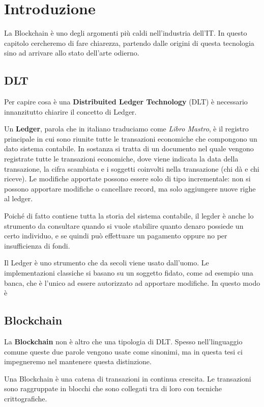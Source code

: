 \chapter{Introduzione}

La Blockchain è uno degli argomenti più caldi nell'industria dell'IT. In questo
capitolo cercheremo di fare chiarezza, partendo dalle origini di questa tecnologia
sino ad arrivare allo stato dell'arte odierno.

\section{DLT}
Per capire cosa è una \textbf{Distribuited Ledger Technology} (DLT) è necessario
innanzitutto chiarire il concetto di Ledger.

Un \textbf{Ledger}, parola che in italiano traduciamo come \textit{Libro Mastro},
è il registro principale in cui sono riunite tutte le transazioni economiche
che compongono un dato sistema contabile. In sostanza si tratta di un documento
nel quale vengono registrate tutte le transazioni economiche, dove viene
indicata la data della transazione, la cifra scambiata e i soggetti coinvolti
nella transazione (chi dà e chi riceve). Le modifiche apportate possono essere solo
di tipo incrementale: non si possono apportare modifiche o cancellare record,
ma solo aggiungere nuove righe al ledger.

Poiché di fatto contiene tutta la storia del sistema contabile, il legder è anche
lo strumento da consultare quando si vuole stabilire quanto denaro possiede un certo
individuo, e se quindi può effettuare un pagamento oppure no per insufficienza
di fondi.

Il Ledger è uno strumento che da secoli viene usato dall'uomo. Le implementazioni
classiche si basano su un soggetto fidato, come ad esempio una banca, che è
l'unico ad essere autorizzato ad apportare modifiche. In questo modo è




\section{Blockchain}
La \textbf{Blockchain} non è altro che una tipologia di DLT. Spesso nell'linguaggio
comune queste due parole vengono usate come sinonimi, ma in questa tesi ci impegneremo
nel mantenere questa distinzione.

Una Blockchain è una catena di transazioni in continua crescita. Le transazioni sono
raggruppate in blocchi che sono collegati tra di loro con tecniche
crittografiche.

